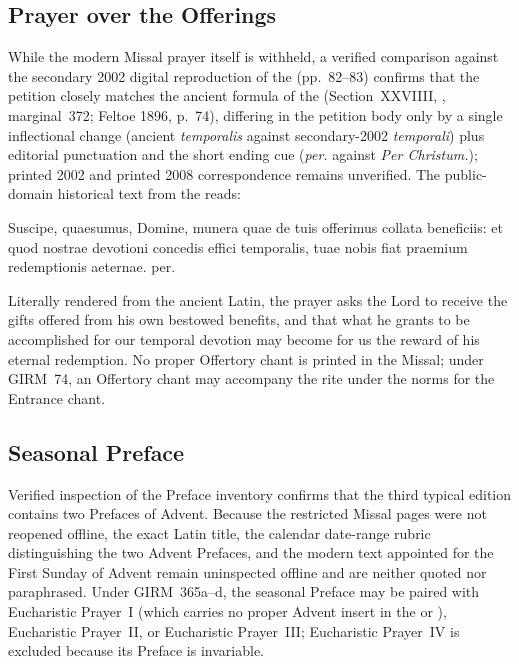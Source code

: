 \subsection{Prayer over the Offerings}\label{proper-prayer-over-the-offerings}
While the modern Missal prayer itself is withheld, a verified comparison against the secondary 2002 digital reproduction of the  (pp.~82--83) confirms that the petition closely matches the ancient formula of the  (Section~XXVIIII, , marginal~372; Feltoe 1896, p.~74), differing in the petition body only by a single inflectional change (ancient \emph{temporalis} against secondary-2002 \emph{temporali}) plus editorial punctuation and the short ending cue (\emph{per.} against \emph{Per Christum.}); printed 2002 and printed 2008 correspondence remains unverified. The public-domain historical text from the  reads:
\begin{latinproper}
Suscipe, quaesumus, Domine, munera quae de tuis offerimus collata beneficiis: et quod nostrae devotioni concedis effici temporalis, tuae nobis fiat praemium redemptionis aeternae. per.
\end{latinproper}
Literally rendered from the ancient Latin, the prayer asks the Lord to receive the gifts offered from his own bestowed benefits, and that what he grants to be accomplished for our temporal devotion may become for us the reward of his eternal redemption. No proper Offertory chant is printed in the Missal; under GIRM~74, an Offertory chant may accompany the rite under the norms for the Entrance chant.

\subsection{Seasonal Preface}\label{proper-preface}
Verified inspection of the  Preface inventory confirms that the third typical edition contains two Prefaces of Advent. Because the restricted Missal pages were not reopened offline, the exact Latin title, the calendar date-range rubric distinguishing the two Advent Prefaces, and the modern text appointed for the First Sunday of Advent remain uninspected offline and are neither quoted nor paraphrased. Under GIRM~365a--d, the seasonal Preface may be paired with Eucharistic Prayer~I (which carries no proper Advent insert in the  or ), Eucharistic Prayer~II, or Eucharistic Prayer~III; Eucharistic Prayer~IV is excluded because its Preface is invariable.

